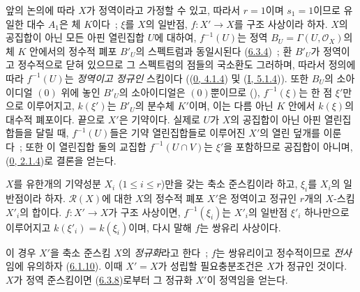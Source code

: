 앞의 논의에 따라 $X$가 정역이라고 가정할 수 있고, 따라서 $r=1$이며
$s_1=1$이므로 유일한 대수 $A_1$은 체 $K$이다~; $\xi$를 $X$의 일반점,
$f:X'\to X$를 구조 사상이라 하자. $X$의 공집합이 아닌 모든 아핀
열린집합 $U$에 대하여, $f^{-1}(U)$는 정역
$B_U=\Gamma(U,\mathcal{O}_X)$의 체 $K$ 안에서의 정수적 폐포 $B'_U$의
스펙트럼과 동일시된다 (\hyperref[II.6.3.4-ko]{6.3.4})~; 환 $B'_U$가
정역이고 정수적으로 닫혀 있으므로 그 스펙트럼의 점들의 국소환도
그러하며, 따라서 정의에 따라 $f^{-1}(U)$는 \emph{정역이고 정규인}
스킴이다 ((\hyperref[0.4.1.4-ko]{0, 4.1.4}) 및
(\hyperref[I.5.1.4-ko]{I, 5.1.4})). 또한 $B_U$의 소아이디얼 $(0)$ 위에
놓인 $B'_U$의 소아이디얼은 $(0)$뿐이므로
(\cite[t.~I, p.~259]{I-13}), $f^{-1}(\xi)$는 한 점 $\xi'$만으로
이루어지고, $k(\xi')$는 $B'_U$의 분수체 $K'$이며, 이는 다름 아닌
$K$ 안에서 $k(\xi)$의 대수적 폐포이다. 끝으로 $X'$은 기약이다. 실제로
$U$가 $X$의 공집합이 아닌 아핀 열린집합들을 달릴 때, $f^{-1}(U)$들은
기약 열린집합들로 이루어진 $X'$의 열린 덮개를 이룬다~; 또한 이 열린집합
둘의 교집합 $f^{-1}(U\cap V)$는 $\xi'$을 포함하므로 공집합이 아니며,
(\hyperref[0.2.1.4-ko]{0, 2.1.4})로 결론을 얻는다.

\begin{corollary}[6.3.8]
\label{II.6.3.8-ko}
$X$를 유한개의 기약성분 $X_i$ ($1\leq i\leq r$)만을 갖는 축소
준스킴이라 하고, $\xi_i$를 $X_i$의 일반점이라 하자. $\mathcal{R}(X)$에
대한 $X$의 정수적 폐포 $X'$은 정역이고 정규인 $r$개의 $X$-스킴
$X'_i$의 합이다. $f:X'\to X$가 구조 사상이면, $f^{-1}(\xi_i)$는
$X'_i$의 일반점 $\xi'_i$ 하나만으로 이루어지고
$k(\xi'_i)=k(\xi_i)$이며, 다시 말해 $f$는 쌍유리 사상이다.
\end{corollary}

이 경우 $X'$을 축소 준스킴 $X$의 \emph{정규화}라고 한다~; $f$는
쌍유리이고 정수적이므로 \emph{전사}임에 유의하자
(\hyperref[II.6.1.10-ko]{6.1.10}). 이때 $X'=X$가 성립할 필요충분조건은
$X$가 정규인 것이다. $X$가 정역 준스킴이면
(\hyperref[II.6.3.8-ko]{6.3.8})로부터 그 정규화 $X'$이 정역임을 얻는다.

